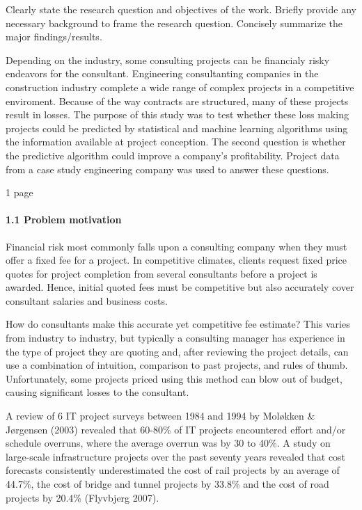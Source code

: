 \documentclass[]{elsarticle} %
\begin{document}
Clearly state the research question and objectives of the work. Briefly
provide any necessary background to frame the research question.
Concisely summarize the major findings/results.

Depending on the industry, some consulting projects can be financialy
risky endeavors for the consultant. Engineering consultanting companies
in the construction industry complete a wide range of complex projects
in a competitive enviroment. Because of the way contracts are
structured, many of these projects result in losses. The purpose of this
study was to test whether these loss making projects could be predicted
by statistical and machine learning algorithms using the information
available at project conception. The second question is whether the
predictive algorithm could improve a company's profitability. Project
data from a case study engineering company was used to answer these
questions.

1 page

\paragraph{1.1 Problem motivation}\label{problem-motivation}

Financial risk most commonly falls upon a consulting company when they
must offer a fixed fee for a project. In competitive climates, clients
request fixed price quotes for project completion from several
consultants before a project is awarded. Hence, initial quoted fees must
be competitive but also accurately cover consultant salaries and
business costs.

How do consultants make this accurate yet competitive fee estimate? This
varies from industry to industry, but typically a consulting manager has
experience in the type of project they are quoting and, after reviewing
the project details, can use a combination of intuition, comparison to
past projects, and rules of thumb. Unfortunately, some projects priced
using this method can blow out of budget, causing significant losses to
the consultant.

A review of 6 IT project surveys between 1984 and 1994 by Moløkken \&
Jørgensen (2003) revealed that 60-80\% of IT projects encountered effort
and/or schedule overruns, where the average overrun was by 30 to 40\%. A
study on large-scale infrastructure projects over the past seventy years
revealed that cost forecasts consistently underestimated the cost of
rail projects by an average of 44.7\%, the cost of bridge and tunnel
projects by 33.8\% and the cost of road projects by 20.4\% (Flyvbjerg
2007).
\end{document}
